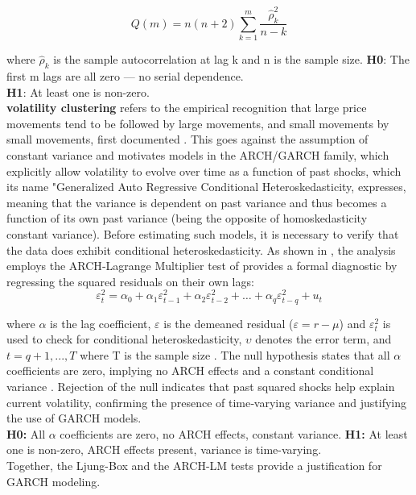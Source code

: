 \documentclass[12pt,a4paper,titlepage,oneside,english]{article}
\begin{document}
$$Q(m) = n(n+2) \sum_{k=1}^{m} \frac{\hat{\rho}_k^2}{n-k}$$

where $\hat{\rho}_k$ is the sample autocorrelation at lag k and n is the sample size.
\textbf{H0}: The first m lags are all zero — no serial dependence.\\
\textbf{H1}: At least one is non-zero. \parencite{Ruey2013}\\

\textbf{volatility clustering} refers to the empirical recognition that large price movements tend to be followed by large movements, and small movements by small movements, first documented \parencite{doi:10.1086/258792}. This goes against the assumption of constant variance and motivates models in the ARCH/GARCH family, which explicitly allow volatility to evolve over time as a function of past shocks, which its name "Generalized Auto Regressive Conditional Heteroskedasticity, expresses, meaning that the variance is dependent on past variance and thus becomes a function of its own past variance (being the opposite of homoskedasticity constant variance). Before estimating such models, it is necessary to verify that the data does exhibit conditional heteroskedasticity. As shown in \parencite{Ruey2013}, the analysis employs the ARCH‑Lagrange Multiplier test of \parencite{ENGLE198283} provides a formal diagnostic by regressing the squared residuals on their own lags:
$$\varepsilon_t^2 = \alpha_0 + \alpha_1 \varepsilon_{t-1}^2 + \alpha_2 \varepsilon_{t-2}^2 + \ldots + \alpha_q \varepsilon_{t-q}^2 + u_t$$

where $\alpha$ is the lag coefficient, $\varepsilon$ is the demeaned residual ($\varepsilon = r - \mu$)  and $\varepsilon_t^2$ is used to check for conditional heteroskedasticity, $\upsilon$ denotes the error term, and $t = q + 1,...,T$ where T is the sample size \parencite{Ruey2013}. The null hypothesis states that all $\alpha$ coefficients are zero, implying no ARCH effects and a constant conditional variance \parencite{Ruey2013}. Rejection of the null indicates that past squared shocks help explain current volatility, confirming the presence of time‑varying variance and justifying the use of GARCH models.\\
\textbf{H0:} All $\alpha$ coefficients are zero, no ARCH effects, constant variance.
\textbf{H1:} At least one is non-zero, ARCH effects present, variance is time-varying. \parencite{Ruey2013}\\
Together, the Ljung-Box and the ARCH-LM tests provide a justification for GARCH modeling. 
\end{document}
